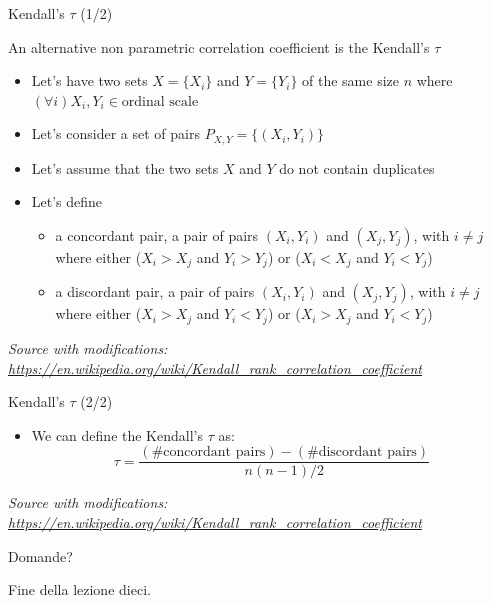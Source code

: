 \documentclass{beamer}
\begin{document}
\begin{frame}
{\centerline{Kendall's $\tau$ (1/2)}}
An alternative non parametric correlation coefficient is the Kendall's $\tau$
\begin{itemize}
   \item Let's have two sets $X = \{X_i\}$ and $Y= \{Y_i\}$ of the same size $n$ where $(\forall i) X_i,Y_i \in \text{ordinal scale}$
   \item Let's consider a set of pairs $P_{X,Y} = \{(X_i,Y_i)\}$ 
   \item Let's assume that the two sets $X$ and $Y$ do not contain duplicates
   \item Let's define
   \begin{itemize}
    \item a concordant pair, a pair of pairs $(X_i,Y_i)$ and $(X_j,Y_j)$, with $i\neq j$ where either ($X_i > X_j$ and $Y_i > Y_j$) or ($X_i < X_j$ and $Y_i < Y_j$)
    \item a discordant pair, a pair of pairs $(X_i,Y_i)$ and $(X_j,Y_j)$, with $i\neq j$ where either ($X_i > X_j$ and $Y_i < Y_j$) or ($X_i > X_j$ and $Y_i < Y_j$)
\end{itemize}

\end{itemize}

\textit{\tiny
\vspace{-\baselineskip}
Source with modifications: \url{https://en.wikipedia.org/wiki/Kendall_rank_correlation_coefficient}}
\end{frame}

\begin{frame}
{\centerline{Kendall's $\tau$ (2/2)}}
\begin{itemize}
\item We can define the Kendall's $\tau$ as:
$$\tau ={\frac {({\text{\# concordant pairs}})-({\text{\# discordant pairs}})}{n(n-1)/2}}$$

\end{itemize}

\textit{\tiny
\vspace{-\baselineskip}
Source with modifications: \url{https://en.wikipedia.org/wiki/Kendall_rank_correlation_coefficient}}
\end{frame}






\begin{frame}
{\centerline{Domande?}}
\vspace{1cm}
\begin{center}
    \LARGE{Fine della lezione dieci.}
\end{center}

\end{frame}


\end{document}
